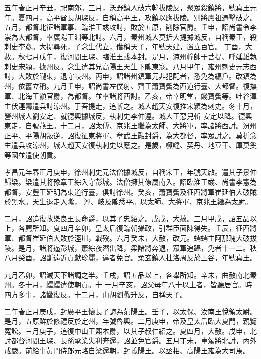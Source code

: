 \begin{pinyinscope}
 五年春正月辛丑，祀南郊。三月，沃野鎮人破六韓拔陵反，聚眾殺鎮將，號真王元年。夏四月，高平酋長胡琛反，自稱高平王，攻鎮以應拔陵。別將盧祖遷擊破之。五月，都督北征諸軍事、臨淮王彧攻討，敗於五原，削除官爵。壬申，詔尚書令李崇為大都督，率廣陽王淵等北討。六月，秦州城人莫折大提據城反，自稱秦王，殺刺史李彥。大提尋死，子念生代立，僭稱天子，年號天建，置立百官。
 丁酉，大赦。秋七月戊午，復河間王琛、臨淮王彧本封。是月，涼州幢帥于菩提、呼延雄執刺史宋潁，據州反。念生遣其兄高陽王天生下隴東寇。八月甲午，雍州刺史元志西討，大敗於隴東，退守岐州。丙申，詔諸州鎮軍元非犯配者，悉免為編戶。改鎮為州，依舊立稱。九月壬申，詔尚書左僕射、齊王蕭寶夤為西道行臺、大都督。復撫軍、北海王顥官爵，為都督。並率諸將西討。乙亥，帝幸明堂，餞寶夤等。吐谷渾主伏連籌遣兵討涼州。于菩提走，追斬之。城人趙天安復推宋潁為刺史。冬十月，營州城人劉安定、就德興據城反，執刺史李仲遵。城人王惡兒斬
 安定以降。德興東走，自號燕王。十二月，詔太傅、京兆王繼為太師、大將軍，率諸將西討。汾州正平、平陽胡叛逆，詔復征東將軍、章武王融封爵，為大都督，率眾討之。莫折念生遣兵攻涼州，城人趙天安復執刺史以應之。是歲，嚈噠、契丹、地豆干、庫莫奚等國並遣使朝貢。



 孝昌元年春正月庚申，徐州刺史元法僧據城反，自稱宋王，年號天啟。遣其子景仲歸梁。梁遣其將豫章王綜入守彭城。法僧擁其僚屬南入。詔臨淮王彧、尚書李憲為都督，安豐王延明為東道行臺，俱討徐州。癸亥，蕭寶夤及征西將軍崔延伯大破賊於黑水。天生退走入隴，
 涇、岐及隴悉平。以太師、大將軍、京兆王繼為太尉。



 二月，詔追復故樂良王長命爵，以其子忠紹之。戊戌，大赦。三月甲戌，詔五品以上，各薦所知。夏四月辛卯，皇太后復臨朝攝政，引群臣面陳得失。壬辰，征西將軍、都督崔延伯大敗於涇川，戰歿。六月癸未，大赦，改元。蠕蠕主阿那瑰大破拔陵。是月，諸將逼彭城，蕭綜夜潛出降，梁諸將奔退，眾軍追躡，免者十一二。秋八月癸酉，詔斷遠近貢獻珍麗，違者免官。柔玄鎮人杜洛周反於上谷，年號真王。



 九月乙卯，詔減天下諸調之半。壬戌，詔五品以上，各舉所知。辛未，曲赦南北秦州。冬十月，蠕蠕遣使朝貢。十
 一月辛亥，詔父母年八十以上者，皆聽居官。時四方多事，諸蠻復反。十二月，山胡劉蠡升反，自稱天子。



 二年春正月庚戌，封廣平王懷長子誨為范陽王。壬子，以太保、汝南王悅領太尉。是月，五原鮮於修禮反於定州，年號魯興。二月庚申，帝及皇太后臨大夏門，親覽冤訟。三月庚子，追復中山王熙本爵，以其子叔仁紹之。夏四月，大赦。戊申，北討都督河間王琛、長孫承業失利奔還，詔並免官爵。五月丁未，車駕將北討，內外戒嚴。前給事黃門侍郎元略自梁還朝，封義陽王。以丞相、高陽王雍為大司馬。




\end{pinyinscope}
